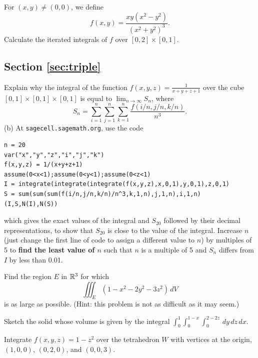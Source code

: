 \documentclass[svgnames]{watsonbook}
\begin{document}
\begin{exercise}{}{}
  For $(x,y) \neq (0,0)$, we define
  \[
    f(x,y) = \frac{xy(x^2-y^2)}{(x^2+y^2)^3}.
  \]
  Calculate the iterated integrals of $f$ over $[0,2]\times[0,1]$.
\end{exercise}

\subsection*{Section \ref{sec:triple}}

\begin{exercise}{}{}
  Explain why the integral of the function
  $f(x,y,z) = \frac{1}{x+y+z+1}$ over the cube
  $[0,1] \times [0,1] \times [0,1]$ is equal to
  $\lim_{n\to\infty} S_n$, where
  \[
    S_n = \sum_{i=1}^n \sum_{j=1}^n \sum_{k=1}^n
    \frac{f(i/n,j/n,k/n)}{n^3}.
  \]
  (b) At \texttt{sagecell.sagemath.org}, use the code
\begin{verbatim} 
n = 20
var("x","y","z","i","j","k")
f(x,y,z) = 1/(x+y+z+1)
assume(0<x<1);assume(0<y<1);assume(0<z<1)
I = integrate(integrate(integrate(f(x,y,z),x,0,1),y,0,1),z,0,1)
S = sum(sum(sum(f(i/n,j/n,k/n)/n^3,k,1,n),j,1,n),i,1,n)
(I,S,N(I),N(S))
\end{verbatim}
  which gives the exact values of the integral and $S_{20}$ followed
  by their decimal representations, to show that $S_{20}$ is close to
  the value of the integral. Increase $n$ (just change the first line
  of code to assign a different value to $n$) by multiples of 5 to
  \textbf{find the least value of $n$} such that $n$ is a multiple of
  5 and $S_n$ differs from $I$ by less than 0.01.
\end{exercise}

\begin{exercise}{}{}
  Find the region $E$ in $\mathbb{R}^3$ for which
  \[
    \iiint_E (1-x^2-2y^2-3z^2) \, dV
  \]
  is as large as possible. (Hint: this problem is not as difficult as
  it may seem.)
\end{exercise}


\begin{exercise}{}{}
  Sketch the solid whose volume is given by the integral $\int_0^1
  \int_0^{1-x}\int_0^{2-2z}\,dy\,dz\,dx$.
\end{exercise}

\begin{exercise}{}{}
  Integrate $f(x,y,z) = 1-z^2$ over the tetrahedron $W$ with vertices
  at the origin, $(1,0,0)$, $(0,2,0)$, and $(0,0,3)$.
\end{exercise}
\end{document}
